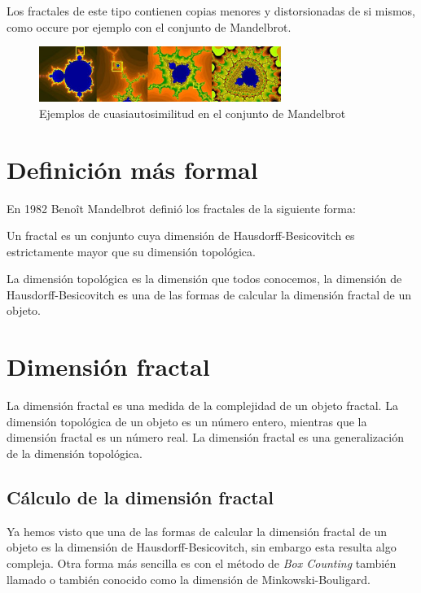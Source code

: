 \noindent
Los fractales de este tipo contienen copias menores y distorsionadas de si mismos, como occure por ejemplo con el conjunto de Mandelbrot.

\begin{figure}[H]
    \centering
    \includegraphics[width=0.7\textwidth]{figures/mandelbrot-cuasi.png}
    \caption{Ejemplos de cuasiautosimilitud en el conjunto de Mandelbrot}
\end{figure}


\section{Definición más formal}

\noindent En 1982 Benoît Mandelbrot definió los fractales de la siguiente forma:

\begin{definition}
Un fractal es un conjunto cuya dimensión de Hausdorff-Besicovitch es estrictamente mayor que su dimensión topológica.
\end{definition}

\noindent La dimensión topológica es la dimensión que todos conocemos, la dimensión de Hausdorff-Besicovitch es una de las formas de calcular la dimensión fractal de un objeto. 

\section{Dimensión fractal}

\noindent La dimensión fractal es una medida de la complejidad de un objeto fractal. La dimensión topológica de un objeto es un número entero, mientras que la dimensión fractal es un número real. La dimensión fractal es una generalización de la dimensión topológica.

\subsection{Cálculo de la dimensión fractal}

\noindent Ya hemos visto que una de las formas de calcular la dimensión fractal de un objeto es la dimensión de Hausdorff-Besicovitch, sin embargo esta resulta algo compleja. Otra forma más sencilla es con el método de \textit{Box Counting} también llamado o también conocido como la dimensión de Minkowski-Bouligard.\\

